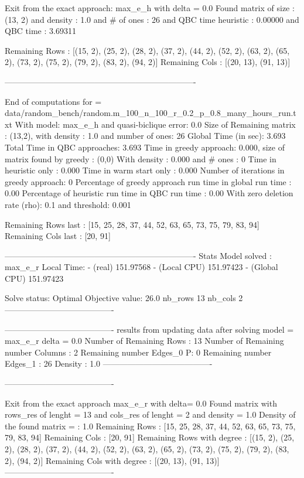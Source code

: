         Exit from the exact approach: max_e_h
        with delta =  0.0
        Found matrix of size : (13, 2)
        and density : 1.0
        and # of ones : 26
        and QBC time heuristic  : 0.00000
        and QBC time  : 3.69311
        
 Remaining Rows  : [(15, 2), (25, 2), (28, 2), (37, 2), (44, 2), (52, 2), (63, 2), (65, 2), (73, 2), (75, 2), (79, 2), (83, 2), (94, 2)]
 Remaining  Cols  : [(20, 13), (91, 13)]

----------------------------------------------------------------------
 
    End of computations for = data/random_bench/random.m_100_n_100_r_0.2_p_0.8_many_hours_run.txt 
    With  model: max_e_h and quasi-biclique error: 0.0
    Size of Remaining matrix : (13,2), with  density : 1.0 and number of ones: 26
    Global Time (in sec): 3.693
    Total Time in QBC approaches: 3.693
    Time in greedy approach: 0.000,  size of matrix found by greedy : (0,0) 
    With density : 0.000 and # ones : 0 
    Time in heuristic only : 0.000 
    Time in warm start only : 0.000
    Number of iterations in greedy approach: 0
    Percentage of greedy approach run time in global run time : 0.00%
    Percentage of heuristic run time in QBC run time : 0.00%
    With zero deletion rate (rho): 0.1 and threshold: 0.001
    
 Remaining Rows last : [15, 25, 28, 37, 44, 52, 63, 65, 73, 75, 79, 83, 94]
 Remaining  Cols  last : [20, 91]
 
 ----------------------------------------------------------------------
Stats
 Model solved : max_e_r  Local Time:  - (real) 151.97568 - (Local CPU) 151.97423 - (Global CPU) 151.97423

 Solve status: Optimal Objective value: 26.0 nb_rows 13 nb_cols 2
----------------------------------------

----------------------------------------
 results from updating data after solving model = max_e_r  delta =   0.0
Number of Remaining  Rows  : 13
Number of Remaining number Columns : 2
Remaining  number Edges_0 P: 0 Remaining  number Edges_1 : 26 Density : 1.0
----------------------------------------

----------------------------------------

Exit from the exact  approach  max_e_r  with delta= 0.0 Found matrix with rows_res of lenght = 13  and cols_res of lenght = 2 and density = 1.0
 Density of the found matrix =  : 1.0
 Remaining Rows  : [15, 25, 28, 37, 44, 52, 63, 65, 73, 75, 79, 83, 94]
 Remaining  Cols  : [20, 91]
 Remaining Rows with degree : [(15, 2), (25, 2), (28, 2), (37, 2), (44, 2), (52, 2), (63, 2), (65, 2), (73, 2), (75, 2), (79, 2), (83, 2), (94, 2)]
 Remaining  Cols with degree : [(20, 13), (91, 13)]
----------------------------------------

